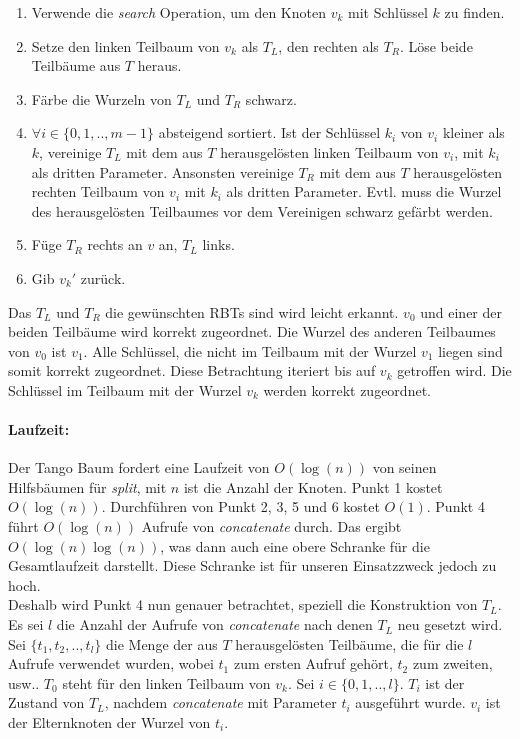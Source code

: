 \documentclass[a4paper,12pt]{article}
\begin{document}
\begin{enumerate}
	\item Verwende die \textit{search} Operation, um den Knoten $v_k$ mit Schlüssel $k$ zu finden.
	\item Setze den linken Teilbaum von $v_k$ als $T_L$, den rechten als $T_R$. Löse beide Teilbäume aus $T$ heraus.
	\item Färbe die Wurzeln von $T_L$ und $T_R$ schwarz.
	\item $\forall i \in \{0,1,..,m-1\}$ absteigend sortiert. Ist der Schlüssel $k_i$ von $v_i$ kleiner als $k$, vereinige $T_L$ mit dem aus $T$ herausgelösten linken Teilbaum von $v_i$, mit  $k_i$ als dritten Parameter. Ansonsten vereinige $T_R$ mit dem aus $T$ herausgelösten rechten Teilbaum von $v_i$ mit  $k_i$ als dritten Parameter. Evtl. muss die Wurzel des herausgelösten Teilbaumes vor dem Vereinigen schwarz gefärbt werden. 
	\item Füge $T_R$ rechts an $v$ an, $T_L$ links.
	\item Gib ${v_k}'$ zurück.
\end{enumerate}   
Das $T_L$ und $T_R$ die gewünschten RBTs sind wird leicht erkannt. $v_0$ und einer der beiden Teilbäume wird korrekt zugeordnet. Die Wurzel des anderen Teilbaumes von $v_0$ ist $v_{1}$. Alle Schlüssel, die nicht im Teilbaum mit der Wurzel $v_{1}$ liegen sind somit korrekt zugeordnet. Diese Betrachtung iteriert bis auf $v_k$ getroffen wird. Die Schlüssel im Teilbaum mit der Wurzel $v_k$ werden korrekt zugeordnet. 

\paragraph{Laufzeit:}
Der Tango Baum fordert eine Laufzeit von $O(\log(n))$ von seinen Hilfsbäumen für \textit{split}, mit $n$ ist die Anzahl der Knoten. Punkt 1 kostet $O(\log(n))$. Durchführen von Punkt 2, 3, 5 und 6 kostet $O(1)$. Punkt 4 führt $O(\log (n))$ Aufrufe von \textit{concatenate} durch. Das ergibt $O(\log (n) \log (n))$, was dann auch eine obere Schranke für die Gesamtlaufzeit darstellt. Diese Schranke ist für unseren Einsatzzweck jedoch zu hoch.\\ Deshalb wird Punkt 4 nun genauer betrachtet, speziell die Konstruktion von $T_L$. Es sei $l$ die Anzahl der Aufrufe von \textit{concatenate} nach denen $T_L$ neu gesetzt wird. Sei $\{t_1,t_2,..,t_l\}$ die Menge der aus $T$ herausgelösten Teilbäume, die für die $l$ Aufrufe verwendet wurden, wobei $t_1$ zum ersten Aufruf gehört, $t_2$ zum zweiten, usw.. $T_0$ steht für den linken Teilbaum von $v_k$.  Sei $i \in \{0, 1, .., l\}$. $T_i$ ist der Zustand von $T_L$, nachdem \textit{concatenate} mit Parameter $t_i$ ausgeführt wurde. $v_i$ ist der Elternknoten der Wurzel von $t_i$.\\
\end{document}
